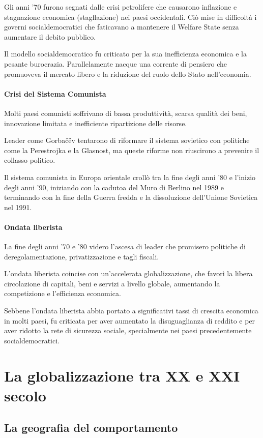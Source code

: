 \documentclass{article}
\begin{document}
Gli anni '70 furono segnati dalle crisi petrolifere che causarono inflazione e stagnazione
economica (stagflazione) nei paesi occidentali. Ciò mise in difficoltà i governi
socialdemocratici che faticavano a mantenere il Welfare State senza aumentare il debito pubblico.

Il modello socialdemocratico fu criticato per la sua inefficienza economica e la pesante
burocrazia. Parallelamente nacque una corrente di pensiero che promuoveva il mercato libero e
la riduzione del ruolo dello Stato nell'economia.

\paragraph*{Crisi del Sistema Comunista} \phantom{}

Molti paesi comunisti soffrivano di bassa produttività, scarsa qualità dei beni, innovazione
limitata e inefficiente ripartizione delle risorse.

Leader come Gorbačëv tentarono di riformare il sistema sovietico con politiche come la 
Perestrojka e la Glasnost, ma queste riforme non riuscirono a prevenire il collasso politico.

Il sistema comunista in Europa orientale crollò tra la fine degli anni '80 e l'inizio degli
anni '90, iniziando con la cadutoa del Muro di Berlino nel 1989 e terminando con la fine
della Guerra fredda e la dissoluzione dell'Unione Sovietica nel 1991.

\paragraph*{Ondata liberista} \phantom{}

La fine degli anni '70 e '80 videro l'ascesa di leader che promisero politiche di
deregolamentazione, privatizzazione e tagli fiscali.

L'ondata liberista coincise con un'accelerata globalizzazione, che favorì la libera circolazione
di capitali, beni e servizi a livello globale, aumentando la competizione e l'efficienza 
economica.

Sebbene l'ondata liberista abbia portato a significativi tassi di crescita economica in molti 
paesi, fu criticata per aver aumentato la disuguaglianza di reddito e per aver ridotto la rete
di sicurezza sociale, specialmente nei paesi precedentemente socialdemocratici.
\pagebreak

\section{La globalizzazione tra XX e XXI secolo}
\subsection{La geografia del comportamento}
\end{document}
